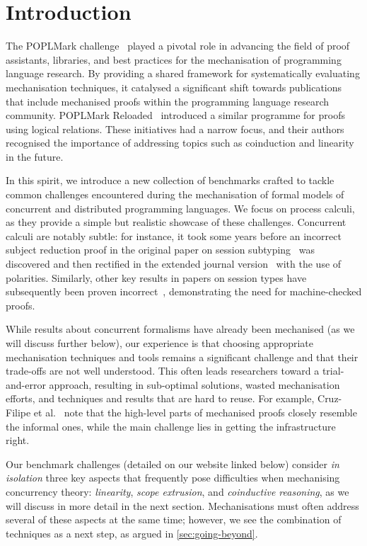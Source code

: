 \documentclass[runningheads]{llncs}
\begin{document}
\section{Introduction}
The POPLMark challenge~\cite{POPLMark}
played a pivotal role in advancing the field of proof assistants,
libraries, and best practices for the mechanisation of programming language research. By providing a shared framework for systematically
evaluating mechanisation techniques, it catalysed a significant
shift towards publications that include mechanised proofs within the programming language research community.
POPLMark Reloaded~\cite{POPLMarkReloaded} introduced a similar programme for proofs using logical relations.
These initiatives had a narrow focus, and their authors recognised the importance of addressing topics such as coinduction and linearity in the future.

In this spirit, we introduce a new collection of benchmarks 
crafted to tackle common challenges encountered during
the mechanisation of formal models of concurrent and distributed
programming languages.  We focus on process calculi, as
they provide a simple but realistic showcase of these challenges.  Concurrent calculi are
notably subtle: for instance, it took some years before an incorrect
subject reduction proof in the original paper on session
subtyping~\cite{GH99} was discovered and then rectified in the extended journal version~\cite{GH05} with the use of
polarities.
Similarly, other key results in papers on session types have subsequently
been proven incorrect~\cite{Gay2020,10.1145/3290343}, demonstrating the
need for machine-checked proofs.

While results about concurrent
formalisms have already been mechanised (as we will discuss further
below), our experience is that choosing appropriate mechanisation
techniques and tools remains a significant challenge and that their
trade-offs are not well understood.  This often leads researchers
toward a trial-and-error approach, resulting in sub-optimal solutions,
wasted mechanisation efforts, and techniques and results that are hard
to reuse. For example, Cruz-Filipe et al.~\cite{Cruz-Filipe2021b} note that the high-level parts of
mechanised proofs closely resemble the informal ones, while the
main challenge lies in getting the infrastructure right.

Our benchmark challenges (detailed on our website linked below)
consider \emph{in isolation} three key aspects that frequently pose
difficulties when mechanising concurrency theory: \emph{linearity},
\emph{scope extrusion}, and \emph{coinductive reasoning}, as we will
discuss in more detail in the next section.  Mechanisations must often
address several of these aspects at the same time; however, we see the
combination of techniques as a next step, as argued in
\cref{sec:going-beyond}.
\end{document}
